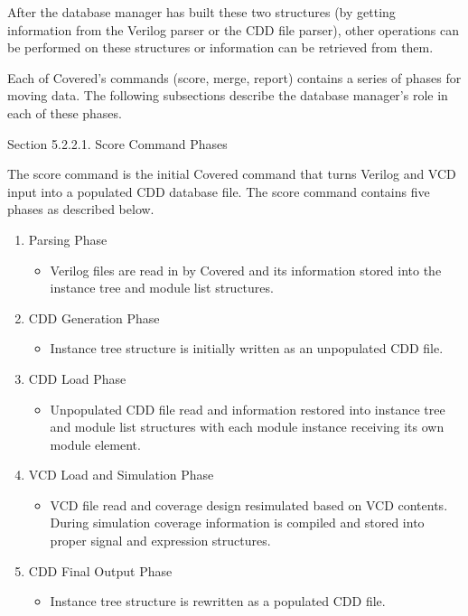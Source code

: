\begin{Desc}
\item[]After the database manager has built these two structures (by getting information from the Verilog parser or the CDD file parser), other operations can be performed on these structures or information can be retrieved from them.\end{Desc}
\begin{Desc}
\item[]Each of Covered's commands (score, merge, report) contains a series of phases for moving data. The following subsections describe the database manager's role in each of these phases.\end{Desc}
\begin{Desc}
\item[Section 5.2.2.1. Score Command Phases]\end{Desc}
\begin{Desc}
\item[]The score command is the initial Covered command that turns Verilog and VCD input into a populated CDD database file. The score command contains five phases as described below.\end{Desc}
\begin{Desc}
\item[]\begin{enumerate}
\item Parsing Phase \begin{itemize}
\item Verilog files are read in by Covered and its information stored into the instance tree and module list structures. \end{itemize}
\item CDD Generation Phase \begin{itemize}
\item Instance tree structure is initially written as an unpopulated CDD file. \end{itemize}
\item CDD Load Phase \begin{itemize}
\item Unpopulated CDD file read and information restored into instance tree and module list structures with each module instance receiving its own module element. \end{itemize}
\item VCD Load and Simulation Phase \begin{itemize}
\item VCD file read and coverage design resimulated based on VCD contents. During simulation coverage information is compiled and stored into proper signal and expression structures. \end{itemize}
\item CDD Final Output Phase \begin{itemize}
\item Instance tree structure is rewritten as a populated CDD file. \end{itemize}
\end{enumerate}
\end{Desc}
